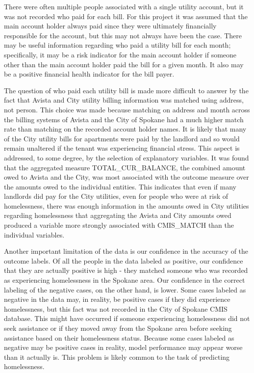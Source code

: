 \documentclass[10pt,letterpaper]{article}
\begin{document}
There were often multiple people associated with a single utility account, but it was not recorded who paid for each bill. For this project it was assumed that the main account holder always paid since they were ultimately financially responsible for the account, but this may not always have been the case. There may be useful information regarding who paid a utility bill for each month; specifically, it may be a risk indicator for the main account holder if someone other than the main account holder paid the bill for a given month. It also may be a positive financial health indicator for the bill payer.

The question of who paid each utility bill is made more difficult to answer by the fact that Avista and City utility billing information was matched using address, not person. This choice was made because matching on address and month across the billing systems of Avista and the City of Spokane had a much higher match rate than matching on the recorded account holder names. It is likely that many of the City utility bills for apartments were paid by the landlord and so would remain unaltered if the tenant was experiencing financial stress. This aspect is addressed, to some degree, by the selection of explanatory variables. It was found that the aggregated measure TOTAL\_CUR\_BALANCE, the combined amount owed to Avista and the City, was most associated with the outcome measure over the amounts owed to the individual entities. This indicates that even if many landlords did pay for the City utilities, even for people who were at risk of homelessness, there was enough information in the amounts owed in City utilities regarding homelessness that aggregating the Avista and City amounts owed produced a variable more strongly associated with CMIS\_MATCH than the individual variables.

Another important limitation of the data is our confidence in the accuracy of the outcome labels. Of all the people in the data labeled as positive, our confidence that they are actually positive is high - they matched someone who was recorded as experiencing homelessness in the Spokane area. Our confidence in the correct labeling of the negative cases, on the other hand, is lower. Some cases labeled as negative in the data may, in reality, be positive cases if they did experience homelessness, but this fact was not recorded in the City of Spokane CMIS database. This might have occurred if someone experiencing homelessness did not seek assistance or if they moved away from the Spokane area before seeking assistance based on their homelessness status. Because some cases labeled as negative may be positive cases in reality, model performance may appear worse than it actually is. This problem is likely common to the task of predicting homelessness.
\end{document}
